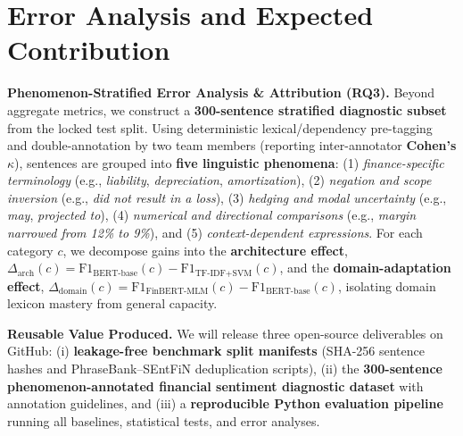\documentclass[11pt,a4paper]{article}
\begin{document}
\section*{Error Analysis and Expected Contribution}
\textbf{Phenomenon-Stratified Error Analysis \& Attribution (RQ3).} Beyond aggregate metrics, we construct a \textbf{300-sentence stratified diagnostic subset} from the locked test split. Using deterministic lexical/dependency pre-tagging and double-annotation by two team members (reporting inter-annotator \textbf{Cohen's $\kappa$}), sentences are grouped into \textbf{five linguistic phenomena}: (1) \textit{finance-specific terminology} (e.g., \textit{liability}, \textit{depreciation}, \textit{amortization}), (2) \textit{negation and scope inversion} (e.g., \textit{did not result in a loss}), (3) \textit{hedging and modal uncertainty} (e.g., \textit{may}, \textit{projected to}), (4) \textit{numerical and directional comparisons} (e.g., \textit{margin narrowed from 12\% to 9\%}), and (5) \textit{context-dependent expressions}. For each category $c$, we decompose gains into the \textbf{architecture effect}, $\Delta_{\text{arch}}(c) = \text{F1}_{\text{BERT-base}}(c) - \text{F1}_{\text{TF-IDF+SVM}}(c)$, and the \textbf{domain-adaptation effect}, $\Delta_{\text{domain}}(c) = \text{F1}_{\text{FinBERT-MLM}}(c) - \text{F1}_{\text{BERT-base}}(c)$, isolating domain lexicon mastery from general capacity.

\textbf{Reusable Value Produced.} We will release three open-source deliverables on GitHub: (i) \textbf{leakage-free benchmark split manifests} (SHA-256 sentence hashes and PhraseBank--SEntFiN deduplication scripts), (ii) the \textbf{300-sentence phenomenon-annotated financial sentiment diagnostic dataset} with annotation guidelines, and (iii) a \textbf{reproducible Python evaluation pipeline} running all baselines, statistical tests, and error analyses.
\end{document}
